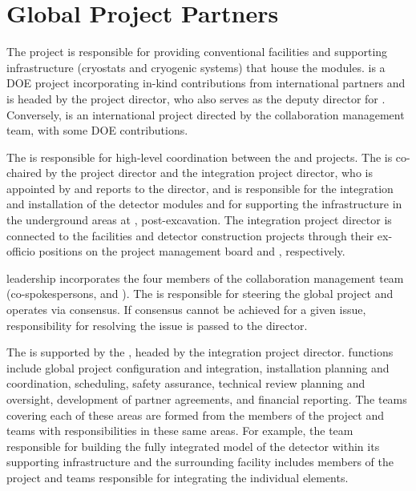 \section{Global Project Partners}
\label{sec:partners}


The  project is responsible for providing conventional
facilities and supporting infrastructure (cryostats and cryogenic
systems)  that house the   modules.  is a  DOE
project incorporating in-kind contributions from international
partners and is headed by the  project director, who also serves as
the  deputy director for .  Conversely,  is an
international project 
directed by the  collaboration management team, with some  DOE contributions. 

The  is responsible for
high-level coordination between the  and 
projects.  The  is co-chaired by the  project director and the
integration project director, who is appointed by and reports to the
  director, and is responsible for the integration and
installation of the detector modules and for supporting the  
infrastructure in the underground areas at , post-excavation.  The
integration project director is connected to the facilities and
detector construction projects through their ex-officio positions on
the  project management board and  ,
respectively.

 leadership incorporates the four members of the 
collaboration management team (co-spokespersons,  and
).  The  is responsible for steering the global
project and operates via consensus.  %
If consensus cannot be achieved for a given issue, responsibility for
resolving the issue is passed to the  director.

The  is supported by the , headed by the
integration project director.   functions include global project
configuration and integration, installation planning and coordination,
scheduling, safety assurance, technical review planning and oversight,
development of partner agreements, and financial reporting.  The 
teams covering each of these areas are formed from the members of the
 project and   teams with
responsibilities in these same areas. %
For example, the  team
responsible for building the fully integrated model of the detector
within its supporting infrastructure and the surrounding facility
includes members of the  project and  
teams responsible for integrating the individual elements.

